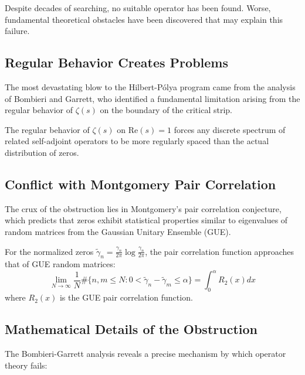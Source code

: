 Despite decades of searching, no suitable operator has been found. Worse, fundamental theoretical obstacles have been discovered that may explain this failure.

\subsection{Regular Behavior Creates Problems}

The most devastating blow to the Hilbert-Pólya program came from the analysis of Bombieri and Garrett, who identified a fundamental limitation arising from the regular behavior of $\zeta(s)$ on the boundary of the critical strip.

\begin{theorem}
\label{thm:bombieri_garrett}
The regular behavior of $\zeta(s)$ on $\text{Re}(s) = 1$ forces any discrete spectrum of related self-adjoint operators to be more regularly spaced than the actual distribution of zeros.
\end{theorem}

\subsection{Conflict with Montgomery Pair Correlation}

The crux of the obstruction lies in Montgomery's pair correlation conjecture, which predicts that zeros exhibit statistical properties similar to eigenvalues of random matrices from the Gaussian Unitary Ensemble (GUE).

\begin{conjecture}
\label{conj:montgomery}
For the normalized zeros $\tilde{\gamma}_n = \frac{\gamma_n}{2\pi}\log\frac{\gamma_n}{2\pi}$, the pair correlation function approaches that of GUE random matrices:
$$\lim_{N \to \infty} \frac{1}{N} \#\{n,m \leq N : 0 < \tilde{\gamma}_n - \tilde{\gamma}_m \leq \alpha\} = \int_0^\alpha R_2(x) dx$$
where $R_2(x)$ is the GUE pair correlation function.
\end{conjecture}

\subsection{Mathematical Details of the Obstruction}

The Bombieri-Garrett analysis reveals a precise mechanism by which operator theory fails:

